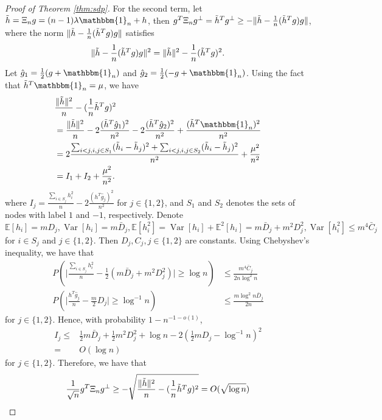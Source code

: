 \documentclass[conference]{IEEEtran}
\DeclarePairedDelimiter\norm{\lVert}{\rVert}
\DeclareMathOperator{\Var}{Var}
\begin{document}
\begin{proof}[Proof of Theorem \ref{thm:sdp}]
	For the second term, let $\tilde{h}=\Xi_n g
	=(n-1)\lambda\mathbbm{1}_n+h$, then
	$g^T \Xi_n g^{\perp} = \tilde{h}^T g^{\perp} \geq -\norm{\tilde{h}-\frac{1}{n}(\tilde{h}^Tg)g}$, where the  norm $\norm{\tilde{h}-\frac{1}{n}(\tilde{h}^Tg)g}$ satisfies
	\begin{align*}
		\norm{\tilde{h}-\frac{1}{n}(\tilde{h}^Tg)g}^2
		=\norm{\tilde{h}}^2 - \frac{1}{n}(\tilde{h}^Tg)^2.
	\end{align*}
	Let $\hat{g}_1 = \frac{1}{2}(g + \mathbbm{1}_n)$ and $\hat{g}_2 = \frac{1}{2}(-g +\mathbbm{1}_n)$.
	Using the fact that $\tilde{h}^T\mathbbm{1}_n=\mu$, we have 
	\begin{align*} 
		&\frac{\norm{\tilde{h}}^2}{n} - (\frac{1}{n}\tilde{h}^Tg)^2\\
		&=\frac{\norm{\tilde{h}}^2}{n} - 2\frac{(\tilde{h}^T \hat{g}_1)^2}{n^2} - 2\frac{(\tilde{h}^T \hat{g}_2)^2}{n^2} + \frac{(\tilde{h}^T\mathbbm{1}_n)^2}{n^2} \\
		&=2\frac{ \sum_{i<j,i,j\in S_1} (\tilde{h}_i - \tilde{h}_j)^2 + \sum_{i<j,i,j\in S_2} (\tilde{h}_i - \tilde{h}_j)^2 }{n^2}+ \frac{\mu^2}{n^2}\\
		& = I_1 + I_2 + \frac{\mu^2}{n^2}.
	\end{align*}
	where $I_j=\frac{\sum_{i\in S_j} h_i^2}{n} - 2\frac{(h^T \hat{g}_j)^2}{n^2}$ for $j\in\{1,2\}$,  and $S_1$ and $S_2$ denotes the sets of nodes with label $1$ and
	$-1$, respectively. Denote $\mathbb{E}[h_i]=m D_j, \Var[h_i]=m \bar{D}_j, \mathbb{E}[h_i^2]=\Var[h_i]+\mathbb{E}^2[h_i]=m \bar{D}_j+m^2 D^2_j, \Var[h_i^2] \leq m^4 \bar{C}_j$ for $i\in S_j$ and $j\in\{1,2\}$. Then
	$D_j, C_j,j\in\{1,2\}$ are constants.
	Using Chebyshev's inequality, we have that
	\begin{align*}
		P(\Big| \frac{\sum_{i\in S_j} h_i^2}{n} - \frac{1}{2}(m \bar{D}_j + m^2D_j^2) \Big| \geq \log n) & \leq \frac{m^4 \bar{C}_j}{2n\log^2 n} \\
		P(\Big| \frac{h^T \hat{g}_j}{n} - \frac{m}{2}D_j\Big| \geq \log^{-1} n) & \leq \frac{m \log^{2} n\bar{D}_j}{2n}
	\end{align*}
	for $j\in\{1,2\}$. Hence, with probability $1-n^{-1-o(1)}$, 
	\begin{align*}
		I_j \leq& \frac{1}{2}m\bar{D}_j + \frac{1}{2}m^2 D_j^2 + \log n - 2(\frac{1}{2}m D_j - \log^{-1} n)^2 \\
		=& O(\log n)
	\end{align*}
	for $j\in\{1,2\}$.
	Therefore, we have that
	$$
	\frac{1}{\sqrt{n}} g^T \Xi_n g^{\perp} \geq -\sqrt{\frac{\norm{\tilde{h}}^2}{n} - (\frac{1}{n}\tilde{h}^Tg)^2} = O(\sqrt{\log n})
	$$
 

\end{proof}
\end{document}
